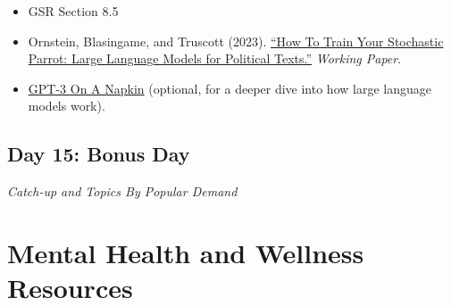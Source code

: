 \documentclass[11pt, letterpaper]{article}
\begin{document}
\begin{itemize}
	\item GSR Section 8.5
	\item Ornstein, Blasingame, and Truscott (2023). \href{https://joeornstein.github.io/publications/ornstein-blasingame-truscott.pdf}{``How To Train Your Stochastic Parrot: Large Language Models for Political Texts.''} \textit{Working Paper}.
	\item \href{https://dugas.ch/artificial_curiosity/GPT_architecture.html}{GPT-3 On A Napkin} (optional, for a deeper dive into how large language models work).
		
\end{itemize}

\subsection*{Day 15: Bonus Day}

\textit{Catch-up and Topics By Popular Demand}

%

\section*{Mental Health and Wellness Resources}
\end{document}
